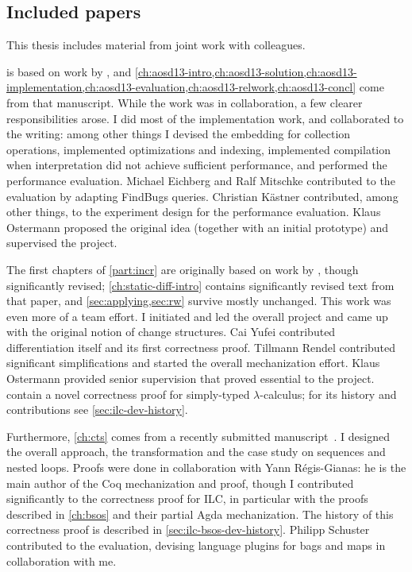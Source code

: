 \subsection{Included papers}
This thesis includes material from joint work with colleagues.

 is based on work by \citet*{GiarrussoAOSD13}, and
\cref{ch:aosd13-intro,ch:aosd13-solution,ch:aosd13-implementation,ch:aosd13-evaluation,ch:aosd13-relwork,ch:aosd13-concl}
come from that manuscript. While the
work was in collaboration, a few clearer responsibilities arose.
I did most of the implementation work, and collaborated to the writing: among
other things I devised the embedding for collection operations, implemented
optimizations and indexing, implemented compilation when interpretation did not
achieve sufficient performance, and performed the performance evaluation.
Michael Eichberg and Ralf Mitschke contributed to the evaluation by adapting
FindBugs queries.
Christian K{\"{a}}stner contributed, among other things, to the experiment
design for the performance evaluation. Klaus Ostermann proposed the original
idea (together with an initial prototype) and supervised the project.

The first chapters of \cref{part:incr} are originally based on work by
\citet*{CaiEtAl2014ILC}, though significantly revised;
\cref{ch:static-diff-intro} contains significantly revised text from that paper,
and \cref{sec:applying,sec:rw} survive mostly unchanged.
This work was even more of a team effort. I initiated and led the
overall project and came up with the original notion of change structures. Cai
Yufei contributed differentiation itself and its first correctness proof.
Tillmann Rendel contributed significant simplifications and started the overall
mechanization effort. Klaus Ostermann provided senior supervision that proved
essential to the project.
 contain a novel correctness proof for
simply-typed $\lambda$-calculus; for its history and contributions see
\cref{sec:ilc-dev-history}.

Furthermore, \cref{ch:cts} comes from a recently submitted
manuscript~\citep*{Giarrusso2018Static}. I
designed the overall approach, the transformation and the case study on
sequences and nested loops. Proofs were done in collaboration with Yann
Régis-Gianas: he is the main author of the Coq mechanization and proof, though I
contributed significantly to the correctness proof for ILC\@, in particular with
the proofs described in \cref{ch:bsos} and their partial Agda mechanization.
The history of this correctness proof is described in
\cref{sec:ilc-bsos-dev-history}.
Philipp Schuster contributed to the evaluation,
devising language plugins for bags and maps in collaboration with me.

